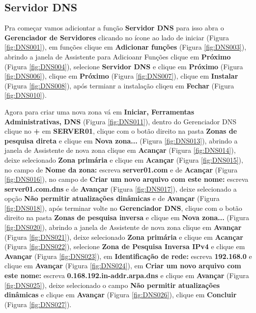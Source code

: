 \documentclass[10pt]{article}
\begin{document}
\subsection{Servidor DNS}
\par Pra começar vamos adiciontar a função \textbf{Servidor DNS} para isso abra o \textbf{Gerenciador de Servidores} clicando no ícone ao lado de iniciar (Figura \ref{fig:DNS001}), em funções clique em \textbf{Adicionar funções} (Figura \ref{fig:DNS003}), abrindo a janela de Assistente para Adicioanr Funções clique em \textbf{Próximo} (Figura \ref{fig:DNS004}), selecione \textbf{Servidor DNS} e clique em \textbf{Próximo} (Figura \ref{fig:DNS006}), clique em \textbf{Próximo} (Figura \ref{fig:DNS007}), clique em \textbf{Instalar} (Figura \ref{fig:DNS008}), após termianr a instalação cliqeu em \textbf{Fechar} (Figura \ref{fig:DNS010}). 
\par Agora para criar uma nova zona vá em \textbf{Iniciar, Ferramentas Administrativas, DNS} (Figura \ref{fig:DNS011}), dentro do Gerenciador DNS clique no \textbf{+} em \textbf{SERVER01}, clique com o botão direito na pasta \textbf{Zonas de pesquisa direta} e clique em \textbf{Nova zona...} (Figura \ref{fig:DNS013}), abrindo a janela de Assistente de nova zona clique em \textbf{Acançar} (Figura \ref{fig:DNS014}), deixe selecionado \textbf{Zona primária} e clique em \textbf{Acançar} (Figura \ref{fig:DNS015}), no campo de \textbf{Nome da zona:} escreva \textbf{server01.com} e de \textbf{Acançar} (Figura \ref{fig:DNS016}), no campo de \textbf{Criar um novo arquivo com este nome:} escreva \textbf{server01.com.dns} e de \textbf{Avançar} (Figura \ref{fig:DNS017}), deixe selecionado a opção \textbf{Não permitir atualizações dinâmicas} e de \textbf{Avançar} (Figura \ref{fig:DNS018}), após terminar volte no \textbf{Gerenciador DNS}, clique com o botão direito na pasta \textbf{Zonas de pesquisa inversa} e clique em \textbf{Nova zona...} (Figura \ref{fig:DNS020}), abrindo a janela de Assistente de nova zona clique em \textbf{Avançar} (Figura \ref{fig:DNS021}), deixe selecionado \textbf{Zona primária} e clique em \textbf{Acançar} (Figura \ref{fig:DNS022}), selecione \textbf{Zona de Pesquisa Inversa IPv4} e clique em \textbf{Avançar} (Figura \ref{fig:DNS023}), em \textbf{Identificação de rede:} escreva \textbf{192.168.0} e clique em \textbf{Avançar} (Figura \ref{fig:DNS024}), em \textbf{Criar um novo arquivo com este nome:} escreva \textbf{0.168.192.in-addr.arpa.dns} e clique em \textbf{Avançar} (Figura \ref{fig:DNS025}), deixe selecionado o campo \textbf{Não permitir atualizações dinâmicas} e clique em \textbf{Avançar} (Figura \ref{fig:DNS026}), clique em \textbf{Concluir} (Figura \ref{fig:DNS027}). 
\end{document}
